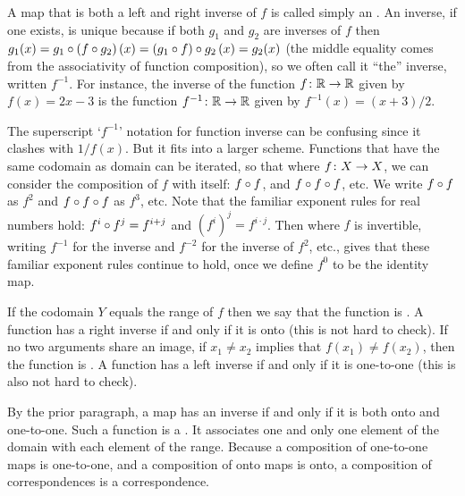 A map that is both a left and right inverse of \( f \)
is called simply an 
.
An inverse, if one exists, is unique because if both \( g_1 \) and
\( g_2 \) are inverses of \( f \) then
\( g_1(x)=g_1\mathbin\circ  (f\mathbin\circ g_2)\,(x)
         =(g_1\mathbin\circ f) \mathbin\circ g_2\,(x)
         =g_2(x) \)
(the middle equality comes from the associativity of function composition),
so we often call it ``the'' inverse, written \( f^{-1} \).
For instance, the inverse of the function \( \mbox{$f\colon \mathbb{R}\to \mathbb{R}$} \)
given by \( f(x)=2x-3 \) is the function \( \mbox{$f^{-1}\colon \mathbb{R}\to \mathbb{R}$} \)
given by \( f^{-1}(x)=(x+3)/2 \).

The superscript `\( f^{-1} \)' notation for function inverse can be 
confusing since it clashes with \( 1/f(x) \).
But it fits into a larger scheme.
Functions that have the same codomain as domain can be iterated,
so that where $\mbox{$f\colon X\to X$}$, we can consider
the composition of $f$ with itself: \( f\mathbin\circ f \), 
and \( f\mathbin\circ f\mathbin\circ f \), etc.
We 
write $f\mathbin\circ f$ as \( f^2 \) and 
$f\mathbin\circ f\mathbin\circ f$ as \( f^3 \), etc.
Note that the familiar exponent rules for real numbers hold:
\( f^i\mathbin\circ f^j=f^{i+j} \) and \( (f^i)^j=f^{i\cdot j} \).
Then where \( f \) is invertible,
writing \( f^{-1} \) for the inverse
and \( f^{-2} \) for the inverse of \( f^2 \), etc., gives that
these familiar exponent rules continue to hold, once we define
\( f^0 \) to be the identity map.

If the codomain \( Y \) equals the range of \( f \) then 
we say that the function is
.
A function has a right inverse if and only if it is onto 
(this is not hard to check).
If no two arguments share an image, if
\( x_1\neq x_2 \) implies  that \( f(x_1)\neq f(x_2) \), then the function is
.
A function has a left inverse if and only if it is one-to-one (this is also 
not hard to check).

By the prior paragraph, a map has an inverse if and only if it is both
onto and one-to-one. 
Such a function is a 
.
It associates one and only one element of the domain with each element of the
range.
Because a composition of one-to-one maps is one-to-one, and a composition
of onto maps is onto, a composition of correspondences is a
correspondence.

